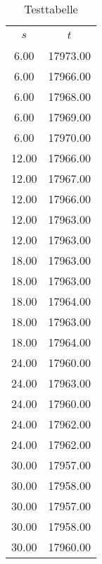 \begin{table} 
 \centering 
 \caption{Testtabelle} 
 \label{tab:some_data} 
 \begin{tabular}{S S } 
 \toprule \\ 
$s$  & $t$ \\ 
\midrule \\ 
 6.00 & 17973.00 \\ 
 6.00 & 17966.00 \\ 
 6.00 & 17968.00 \\ 
 6.00 & 17969.00 \\ 
 6.00 & 17970.00 \\ 
 12.00 & 17966.00 \\ 
 12.00 & 17967.00 \\ 
 12.00 & 17966.00 \\ 
 12.00 & 17963.00 \\ 
 12.00 & 17963.00 \\ 
 18.00 & 17963.00 \\ 
 18.00 & 17963.00 \\ 
 18.00 & 17964.00 \\ 
 18.00 & 17963.00 \\ 
 18.00 & 17964.00 \\ 
 24.00 & 17960.00 \\ 
 24.00 & 17963.00 \\ 
 24.00 & 17960.00 \\ 
 24.00 & 17962.00 \\ 
 24.00 & 17962.00 \\ 
 30.00 & 17957.00 \\ 
 30.00 & 17958.00 \\ 
 30.00 & 17957.00 \\ 
 30.00 & 17958.00 \\ 
 30.00 & 17960.00 \\ 
 \bottomrule 
 \end{tabular} 
 \end{table}